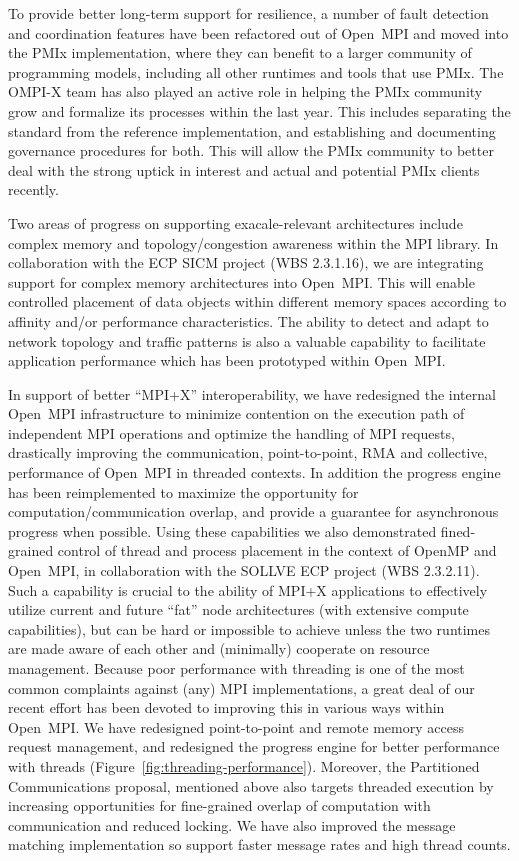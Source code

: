 To provide better long-term support for resilience, a number of fault detection and coordination features have been refactored out of Open~MPI and moved into the PMIx implementation, where they can benefit to a larger community of programming models, including all other runtimes and tools that use PMIx.  The OMPI-X team has also played an active role in helping the PMIx community grow and formalize its processes within the last year.  This includes separating the standard from the reference implementation, and establishing and documenting governance procedures for both.  This will allow the PMIx community to better deal with the strong uptick in interest and actual and potential PMIx clients recently.

Two areas of progress on supporting exacale-relevant architectures include complex memory and topology/congestion awareness within the MPI library. In collaboration with the ECP SICM project (WBS 2.3.1.16), we are integrating support for complex memory architectures into Open~MPI.  This will enable controlled placement of data objects within different memory spaces according to affinity and/or performance characteristics.  The ability to detect and adapt to network topology and traffic patterns is also a valuable capability to facilitate application performance which has been prototyped within Open~MPI.

In support of better ``MPI+X'' interoperability, we have redesigned the internal Open~MPI infrastructure to minimize contention on the execution path of independent MPI operations and optimize the handling of MPI requests, drastically improving the communication, point-to-point, RMA and collective, performance of Open~MPI in threaded contexts. In addition the progress engine has been reimplemented to maximize the opportunity for computation/communication overlap, and provide a guarantee for asynchronous progress when possible. Using these capabilities we also demonstrated fined-grained control of thread and process placement in the context of OpenMP and Open~MPI, in collaboration with the SOLLVE ECP project (WBS 2.3.2.11). Such a capability is crucial to the ability of MPI+X applications to effectively utilize current and future ``fat'' node architectures (with extensive compute capabilities), but can be hard or impossible to achieve unless the two runtimes are made aware of each other and (minimally) cooperate on resource management.
%
Because poor performance with threading is one of the most common
complaints against (any) MPI implementations, a great deal of our
recent effort has been devoted to improving this in various ways
within Open~MPI.  We have redesigned point-to-point and remote
memory access request management, and redesigned the progress engine
for better performance with threads (Figure~\ref{fig:threading-performance}).
Moreover, the Partitioned Communications proposal, mentioned above also targets threaded execution by increasing opportunities for fine-grained overlap of computation with communication and reduced locking.  We have also improved the message matching implementation so support faster message rates and high thread counts.

